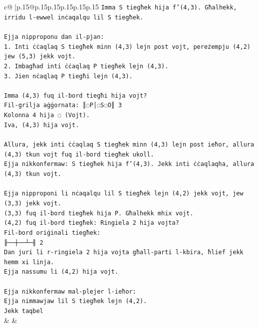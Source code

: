 \documentclass{article}
\begin{document}
{\begin{supertabular}{c@{$\;$}|p{.15\linewidth}@{}p{.15\linewidth}p{.15\linewidth}p{.15\linewidth}p{.15\linewidth}p{.15\linewidth}}
{{{\texttt{Imma S tiegħek hija f'(4,3). Għalhekk, irridu l{-}ewwel inċaqalqu lil S tiegħek.} \\
\\ 
\texttt{Ejja nipproponu dan il{-}pjan:} \\
\texttt{1. Inti ċċaqlaq S tiegħek minn (4,3) lejn post vojt, pereżempju (4,2) jew (5,3) jekk vojt.} \\
\texttt{2. Imbagħad inti ċċaqlaq P tiegħek lejn (4,3).} \\
\texttt{3. Jien nċaqlaq P tiegħi lejn (4,3).} \\
\\ 
\texttt{Imma (4,3) fuq il{-}bord tiegħi hija vojt?} \\
\texttt{Fil{-}grilja aġġornata: ║◌P│◌S◌O║ 3} \\
\texttt{Kolonna 4 hija ◌ (Vojt).} \\
\texttt{Iva, (4,3) hija vojt.} \\
\\ 
\texttt{Allura, jekk inti ċċaqlaq S tiegħek minn (4,3) lejn post ieħor, allura (4,3) tkun vojt fuq il{-}bord tiegħek ukoll.} \\
\texttt{Ejja nikkonfermaw: S tiegħek hija f'(4,3). Jekk inti ċċaqlaqha, allura (4,3) tkun vojt.} \\
\\ 
\texttt{Ejja nipproponi li nċaqalqu lil S tiegħek lejn (4,2) jekk vojt, jew (3,3) jekk vojt.} \\
\texttt{(3,3) fuq il{-}bord tiegħek hija P. Għalhekk mhix vojt.} \\
\texttt{(4,2) fuq il{-}bord tiegħek: Ringiela 2 hija vojta?} \\
\texttt{Fil{-}bord oriġinali tiegħek:} \\
\texttt{╟──┼──┴─╢ 2} \\
\texttt{Dan juri li r{-}ringiela 2 hija vojta għall{-}parti l{-}kbira, ħlief jekk hemm xi linja.} \\
\texttt{Ejja nassumu li (4,2) hija vojt.} \\
\\ 
\texttt{Ejja nikkonfermaw mal{-}plejer l{-}ieħor:} \\
\texttt{Ejja nimmawjaw lil S tiegħek lejn (4,2).} \\
\texttt{Jekk taqbel} \\
            }
        }
    }
    & & \\ \\


\end{supertabular}}
\end{document}
